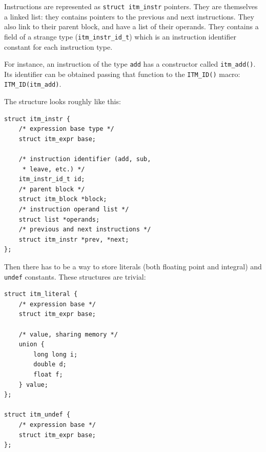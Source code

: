 \documentclass[12pt, a4paper]{article}
\begin{document}
Instructions are represented as \verb+struct itm_instr+ pointers. They are
themselves a linked list: they contains pointers to the previous and next
instructions. They also link to their parent block, and have a list of their
operands. They contains a field of a strange type (\verb+itm_instr_id_t+) which
is an instruction identifier constant for each instruction type.

For instance, an instruction of the type \verb+add+ has a constructor called
\verb+itm_add()+. Its identifier can be obtained passing that function to the
\verb+ITM_ID()+ macro: \verb+ITM_ID(itm_add)+.

The structure looks roughly like this:

\begin{lstlisting}
struct itm_instr {
	/* expression base type */
	struct itm_expr base;

	/* instruction identifier (add, sub,
	 * leave, etc.) */
	itm_instr_id_t id;
	/* parent block */
	struct itm_block *block;
	/* instruction operand list */
	struct list *operands;
	/* previous and next instructions */
	struct itm_instr *prev, *next;
};
\end{lstlisting}

Then there has to be a way to store literals (both floating point and integral)
and \verb+undef+ constants. These structures are trivial:

\begin{lstlisting}
struct itm_literal {
	/* expression base */
	struct itm_expr base;

	/* value, sharing memory */
	union {
		long long i;
		double d;
		float f;
	} value;
};

struct itm_undef {
	/* expression base */
	struct itm_expr base;
};
\end{lstlisting}
\end{document}
